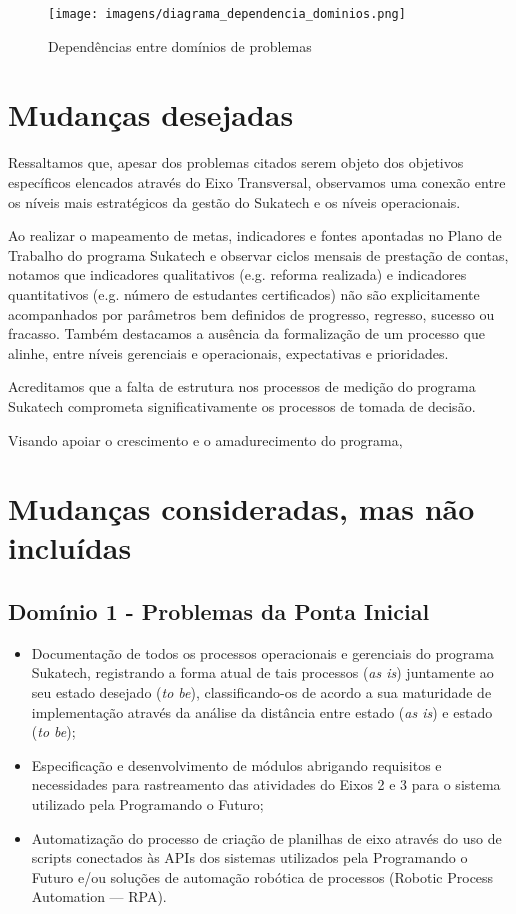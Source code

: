 \documentclass[
	12pt,				%
	openright,			%
	twoside,			%
	a4paper,			%
	english,			%
	french,				%
	spanish,			%
	brazil,				%
	]{abntex2}
\begin{document}
\begin{figure}[h]
	\caption{\label{rep_dependencia_dominio}Dependências entre domínios de problemas}
	\begin{center}

  \texttt{[image: imagens/diagrama\_dependencia\_dominios.png]}
	\end{center}
\end{figure}

\chapter{Mudanças desejadas}

Ressaltamos que, apesar dos problemas citados serem objeto dos objetivos específicos elencados através do Eixo Transversal, observamos uma conexão entre os níveis mais estratégicos da gestão do Sukatech e os níveis operacionais.

Ao realizar o mapeamento de metas, indicadores e fontes apontadas no Plano de Trabalho do programa Sukatech e observar ciclos mensais de prestação de contas, notamos que indicadores qualitativos (e.g. reforma realizada) e indicadores quantitativos (e.g. número de estudantes certificados) não são explicitamente acompanhados por parâmetros bem definidos de progresso, regresso, sucesso ou fracasso. Também destacamos a ausência da formalização de um processo que alinhe, entre níveis gerenciais e operacionais, expectativas e prioridades.

Acreditamos que a falta de estrutura nos processos de medição do programa Sukatech comprometa significativamente os processos de tomada de decisão.

Visando apoiar o crescimento e o amadurecimento do programa, 

\chapter{Mudanças consideradas, mas não incluídas}
\section{Domínio 1 - Problemas da Ponta Inicial}
\begin{itemize}
  \item Documentação de todos os processos operacionais e gerenciais do programa Sukatech, registrando a forma atual de tais processos (\textit{as is}) juntamente ao seu estado desejado (\textit{to be}), classificando-os de acordo a sua maturidade de implementação através da análise da distância entre estado (\textit{as is}) e estado (\textit{to be});
  \item Especificação e desenvolvimento de módulos abrigando requisitos e necessidades para rastreamento das atividades do Eixos 2 e 3 para o sistema utilizado pela Programando o Futuro;
  \item Automatização do processo de criação de planilhas de eixo através do uso de scripts conectados às APIs dos sistemas utilizados pela Programando o Futuro e/ou soluções de automação robótica de processos (Robotic Process Automation — RPA).
\end{itemize}
\end{document}
